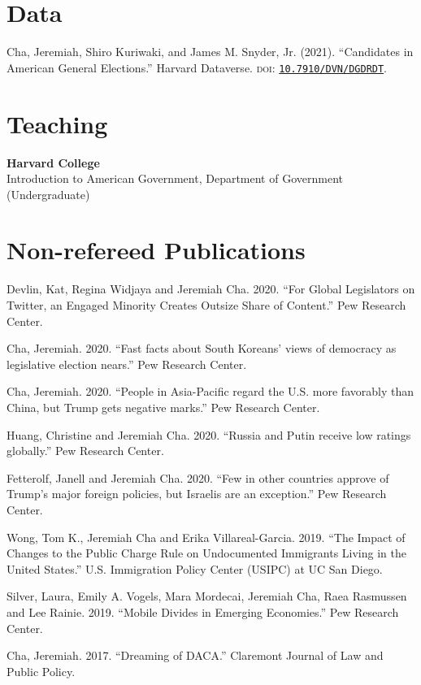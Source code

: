 \documentclass[margin, line]{res}
\begin{document}
\begin{resume}
\section{Data}
\begin{etaremune}
	\item Cha, Jeremiah, Shiro Kuriwaki, and James M. Snyder, Jr. (2021). ``Candidates in American General Elections.'' Harvard Dataverse. \textsc{doi}: \href{https://doi.org/10.7910/DVN/DGDRDT}{\texttt{10.7910/DVN/DGDRDT}}.
\end{etaremune}

\section{Teaching}
\textbf{Harvard College}\\
Introduction to American Government, Department of Government (Undergraduate) 

\section{Non-refereed Publications}
\begin{etaremune}
	\item Devlin, Kat, Regina Widjaya and Jeremiah Cha. 2020. ``For Global Legislators on Twitter, an Engaged Minority Creates Outsize Share of Content.'' Pew Research Center.
	\item Cha, Jeremiah. 2020. ``Fast facts about South Koreans’ views of democracy as legislative election nears.'' Pew Research Center.
	\item Cha, Jeremiah. 2020. ``People in Asia-Pacific regard the U.S. more favorably than China, but Trump gets negative marks.'' Pew Research Center.
	\item Huang, Christine and Jeremiah Cha. 2020. ``Russia and Putin receive low ratings globally.'' Pew Research Center.
	\item Fetterolf, Janell and Jeremiah Cha. 2020. ``Few in other countries approve of Trump’s major foreign policies, but Israelis are an exception.'' Pew Research Center.
	\item Wong, Tom K., Jeremiah Cha and Erika Villareal-Garcia. 2019. ``The Impact of Changes to the Public Charge Rule on Undocumented Immigrants Living in the United States.'' U.S. Immigration Policy Center (USIPC) at UC San Diego.
	\item Silver, Laura, Emily A. Vogels, Mara Mordecai, Jeremiah Cha, Raea Rasmussen and Lee Rainie. 2019. ``Mobile Divides in Emerging Economies.'' Pew Research Center.
	\item Cha, Jeremiah. 2017. ``Dreaming of DACA.'' Claremont Journal of Law and Public Policy.
\end{etaremune}


\end{resume}
\end{document}
